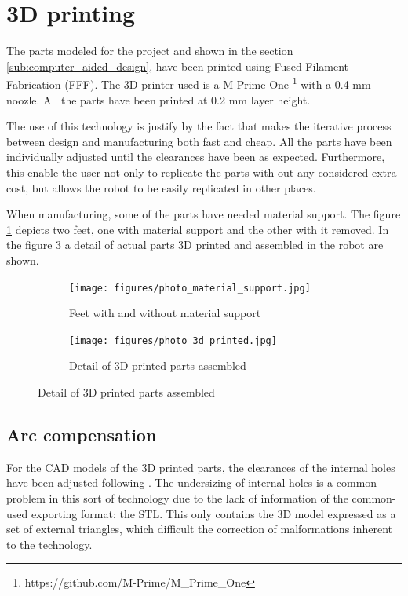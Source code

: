 \section{3D printing} %
\label{sec:3d_printing}
The parts modeled for the project and shown in the section \ref{sub:computer_aided_design}, have been printed using Fused Filament Fabrication (FFF).
The 3D printer used is a M Prime One \footnote{https://github.com/M-Prime/M\_Prime\_One} with a 0.4 mm noozle.
All the parts have been printed at 0.2 mm layer height.

The use of this technology is justify by the fact that makes the iterative process between design and manufacturing both fast and cheap.
All the parts have been individually adjusted until the clearances have been as expected.
Furthermore, this enable the user not only to replicate the parts with out any considered extra cost, but allows the robot to be easily replicated in other places.

When manufacturing, some of the parts have needed material support.
The figure \ref{fig:photo_material_support} depicts two feet, one with material support and the other with it removed.
In the figure \ref{fig:photo_3d_printed} a detail of actual parts 3D printed and assembled in the robot are shown.

\begin{figure}[ht]
    \centering
    \begin{subfigure}[b]{0.49\textwidth}
        \texttt{[image: figures/photo\_material\_support.jpg]}
        \caption{Feet with and without material support}
        \label{fig:photo_material_support}
    \end{subfigure}
    \begin{subfigure}[b]{0.49\textwidth}
        \texttt{[image: figures/photo\_3d\_printed.jpg]}
        \caption{Detail of 3D printed parts assembled}
        \label{fig:photo_3d_printed}
    \end{subfigure}
\end{figure}

  \subsection{Arc compensation} %
  \label{sub:arc_compensation}
  For the CAD models of the 3D printed parts, the clearances of the internal holes have been adjusted following \cite{arc_compensation}.
  The undersizing of internal holes is a common problem in this sort of technology due to the lack of information of the common-used exporting format: the STL.
  This only contains the 3D model expressed as a set of external triangles, which difficult the correction of malformations inherent to the technology.

